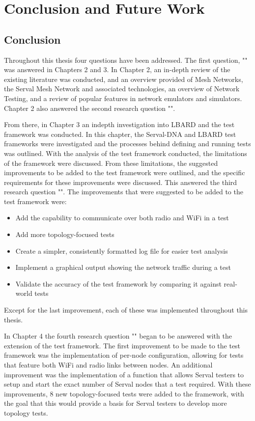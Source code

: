 
\chapter{Conclusion and Future Work} %

\label{Chapter8}

\section{Conclusion}

Throughout this thesis four questions have been addressed.
The first question, "\firstRQ" was answered in Chapters 2 and 3.
In Chapter 2, an in-depth review of the existing literature was conducted, and an overview provided of Mesh Networks, the Serval Mesh Network and associated technologies, an overview of Network Testing, and a review of popular features in network emulators and simulators.
Chapter 2 also answered the second research question "\secondRQ".

From there, in Chapter 3 an indepth investigation into LBARD and the test framework was conducted.
In this chapter, the Serval-DNA and LBARD test frameworks were investigated and the processes behind defining and running tests was outlined. 
With the analysis of the test framework conducted, the limitations of the framework were discussed.
From these limitations, the suggested improvements to be added to the test framework were outlined, and the specific requirements for these improvements were discussed.
This answered the third research question "\thirdRQ".
The improvements that were suggested to be added to the test framework were:
\begin{itemize}
    \item Add the capability to communicate over both radio and WiFi in a test
    \item Add more topology-focused tests
    \item Create a simpler, consistently formatted log file for easier test analysis
    \item Implement a graphical output showing the network traffic during a test
    \item Validate the accuracy of the test framework by comparing it against real-world tests
\end{itemize}
Except for the last improvement, each of these was implemented throughout this thesis.

In Chapter 4 the fourth research question "\fourthRQ" began to be answered with the extension of the test framework. 
The first improvement to be made to the test framework was the implementation of per-node configuration, allowing for tests that feature both WiFi and radio links between nodes.
An additional improvement was the implementation of a function that allows Serval testers to setup and start the exact number of Serval nodes that a test required.
With these improvements, 8 new topology-focused tests were added to the framework, with the goal that this would provide a basis for Serval testers to develop more topology tests.

